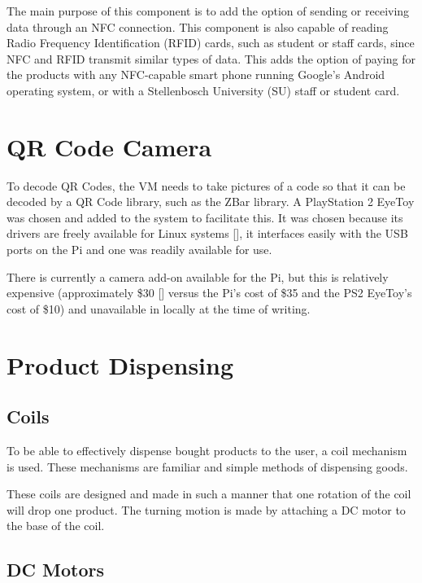 The main purpose of this component is to add the option of sending or receiving data
through an NFC connection. This component is also capable of reading Radio
Frequency Identification (RFID) cards, such as student or staff cards, since NFC and RFID
transmit similar types of data. This adds the option of paying for the products with any
NFC-capable smart phone running Google's Android operating system, or with a Stellenbosch
University (SU) staff or student card.

\section{QR Code Camera}
\label{sec:webcam}

To decode QR Codes, the VM needs to take pictures of a code so that it can be
decoded by a QR Code library, such as the ZBar library. A PlayStation 2 EyeToy was
chosen and added to the system to facilitate this. It was chosen because its drivers are
freely available for Linux systems [\cite{website:webcam-drivers}], it interfaces easily
with the USB ports on the Pi and one was readily available for use.

There is currently a camera add-on available for the Pi, but this is relatively
expensive (approximately \$30 [\cite{website:raspi-camera}] versus the Pi's cost of \$35 
and the PS2 EyeToy's cost of \$10) and unavailable in locally at the time of writing.

\section{Product Dispensing}

\subsection{Coils}

To be able to effectively dispense bought products to the user, a coil mechanism is
used. These mechanisms are familiar and simple methods of dispensing goods.

These coils are designed and made in such a manner that one rotation of the coil will drop one
product. The turning motion is made by attaching a DC motor to the base of the coil.

\subsection{DC Motors}
\label{sec:dc-motor}

